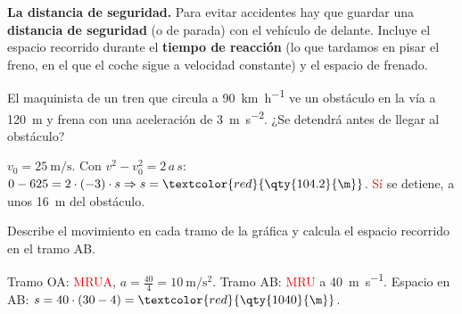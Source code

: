 \begin{remark}
    \textbf{La distancia de seguridad.} Para evitar accidentes hay que guardar una \textbf{distancia de seguridad} (o de parada) con el vehículo de delante. Incluye el espacio recorrido durante el \textbf{tiempo de reacción} (lo que tardamos en pisar el freno, en el que el coche sigue a velocidad constante) y el espacio de frenado.
\end{remark}

\begin{exercise}
    El maquinista de un tren que circula a \qty{90}{\km\per\hour} ve un obstáculo en la vía a \qty{120}{\m} y frena con una aceleración de \qty{3}{\m\per\square\s}. ¿Se detendrá antes de llegar al obstáculo?
    \begin{solu}
        \(v_0 = \qty{25}{\m\per\s}\). Con \(v^2 - v_0^2 = 2\,a\,s\): \(0 - 625 = 2 \cdot (-3) \cdot s \Rightarrow s = \textcolor{red}{\qty{104.2}{\m}}\). \textcolor{red}{Sí} se detiene, a unos \qty{16}{\m} del obstáculo.
    \end{solu}
\end{exercise}

\begin{exercise}
    Describe el movimiento en cada tramo de la gráfica y calcula el espacio recorrido en el tramo AB.
    \begin{center}
    \end{center}
    \begin{solu}
        Tramo OA: \textcolor{red}{MRUA}, \(a = \frac{40}{4} = \qty{10}{\m\per\square\s}\). Tramo AB: \textcolor{red}{MRU} a \qty{40}{\m\per\s}. Espacio en AB: \(s = 40 \cdot (30 - 4) = \textcolor{red}{\qty{1040}{\m}}\).
    \end{solu}
\end{exercise}

